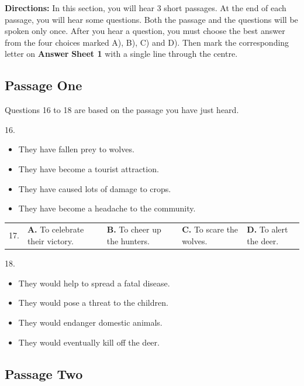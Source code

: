 \documentclass[UTF8,11pt]{ctexart}
\begin{document}
\textbf{Directions:} In this section, you will hear 3 short passages. At the end of each passage, you will hear some questions. Both the passage and the questions will be spoken only once. After you hear a question, you must choose the best answer from the four choices marked A), B), C) and D). Then mark the corresponding letter on\textbf{ Answer} \textbf{Sheet 1} with a single line through the centre.


\subsection*{Passage One}


Questions 16 to 18 are based on the passage you have just heard.


16.


\begin{itemize}[leftmargin=2em,itemsep=.2em,topsep=.4em]\item[A.] They have fallen prey to wolves.
\item[B.] They have become a tourist attraction.
\item[C.] They have caused lots of damage to crops.
\item[D.] They have become a headache to the community.
\end{itemize}

\noindent\begin{tabularx}{\linewidth}{@{}lXXXX@{}}17. & \textbf{A.} To celebrate their victory. & \textbf{B.} To cheer up the hunters. & \textbf{C.} To scare the wolves. & \textbf{D.} To alert the deer.\\\end{tabularx}\par

18.


\begin{itemize}[leftmargin=2em,itemsep=.2em,topsep=.4em]\item[A.] They would help to spread a fatal disease.
\item[B.] They would pose a threat to the children.
\item[C.] They would endanger domestic animals.
\item[D.] They would eventually kill off the deer.
\end{itemize}

\subsection*{Passage Two}
\end{document}
